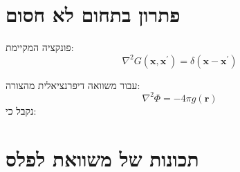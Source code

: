 \documentclass{tstextbook}
\begin{document}
\section{פתרון בתחום לא חסום}

\begin{definition}
פונקציה המקיימת:
$$\nabla^{2}G(\mathbf{x},\mathbf{x}^{\prime})=\delta(\mathbf{x}-\mathbf{x}^{\prime})$$

\end{definition}
\begin{proposition}
עבור משוואה דיפרנציאלית מהצורה:
$$\nabla^{2}\Phi=-4\pi g(\mathbf{r})$$
נקבל כי:

\end{proposition}

\section{תכונות של משוואת לפלס}
\end{document}
